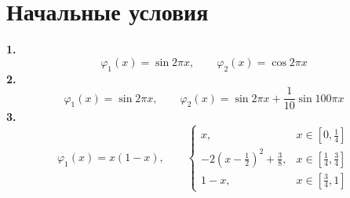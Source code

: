 \documentclass[titlepage]{article}
\def\l{\left}
\def\r{\right}
\begin{document}
\section{Начальные условия}
\indent \textbf{1. }
	$$\varphi_1(x) = \sin{2 \pi x}, \qquad \varphi_2(x) = \cos{2 \pi x}$$
\indent \textbf{2. }
	$$\varphi_1(x) = \sin{2 \pi x}, \qquad \varphi_2(x) = \sin{2 \pi x} + \frac{1}{10}\sin{100 \pi x}$$
\indent \textbf{3. }
	$$\varphi_1(x) = x(1-x), \qquad 
	\begin{cases}
		x, & x \in \l[0, \frac{1}{4}\r] \\
		-2\l(x-\frac{1}{2}\r)^2 + \frac{3}{8}, & x \in \l[\frac{1}{4}, \frac{3}{4}\r] \\
		1-x, & x \in \l[\frac{3}{4}, 1\r]
	\end{cases}$$
\end{document}
